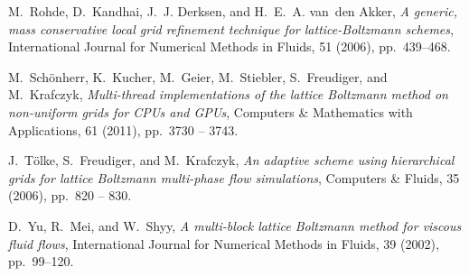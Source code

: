 \documentclass[final,leqno,onefignum,onetabnum]{siamltex1213}
\begin{document}
\begin{thebibliography}{10}
{\sc M.~Rohde, D.~Kandhai, J.~J. Derksen, and H.~E.~A. van~den Akker}, {\em A
  generic, mass conservative local grid refinement technique for
  lattice-{Boltzmann} schemes}, International Journal for Numerical Methods in
  Fluids, 51 (2006), pp.~439--468.

{\sc M.~Schönherr, K.~Kucher, M.~Geier, M.~Stiebler, S.~Freudiger, and
  M.~Krafczyk}, {\em Multi-thread implementations of the lattice {Boltzmann}
  method on non-uniform grids for {CPUs} and {GPUs}}, Computers \& Mathematics
  with Applications, 61 (2011), pp.~3730 -- 3743.

{\sc J.~Tölke, S.~Freudiger, and M.~Krafczyk}, {\em An adaptive scheme using
  hierarchical grids for lattice {Boltzmann} multi-phase flow simulations},
  Computers \& Fluids, 35 (2006), pp.~820 -- 830.

{\sc D.~Yu, R.~Mei, and W.~Shyy}, {\em A multi-block lattice {Boltzmann} method
  for viscous fluid flows}, International Journal for Numerical Methods in
  Fluids, 39 (2002), pp.~99--120.

\end{thebibliography}
\end{document}
